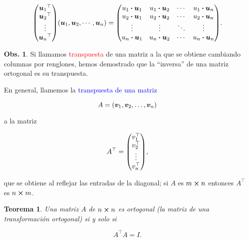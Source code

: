 \documentclass{article}
\theoremstyle{definicion}
\theoremstyle{definition}             %
\theoremstyle{definition}             %
\theoremstyle{definition}
\theoremstyle{definition}
\theoremstyle{observacion}
\newtheorem{obs}{Obs.}
\theoremstyle{definition}
\theoremstyle{plain}
\newtheorem{theorem}{Teorema}
\theoremstyle{definition}
\theoremstyle{afirmacion}
\theoremstyle{notation}
\theoremstyle{definition}
\begin{document}
    \begin{equation*}
        \mqty({\vb*{u}_{1}}^{\top}\\ {\vb*{u}_{2}}^{\top}\\ \vdots\\ {\vb*{u}_{n}}^{\top})(\vb*{u}_{1}, \vb*{u}_{2}, \cdots, \vb*{u}_{n}) = \mqty(u_{1} \vdot \vb*{u}_{1} & u_{1} \vdot \vb*{u}_{2} & \cdots & u_{1} \vdot \vb*{u}_{n}\\
        u_{2} \vdot \vb*{u}_{1} & u_{2} \vdot \vb*{u}_{2} & \cdots & u_{2} \vdot \vb*{u}_{n}\\
        \vdots & \vdots & \ddots & \vdots\\
        u_{n} \vdot \vb*{u}_{1} & u_{n} \vdot \vb*{u}_{2} & \cdots & u_{n} \vdot \vb*{u}_{n}). 
    \end{equation*}

    \begin{obs}
        Si llamamos \textcolor{red}{transpuesta} de una matriz a la que se obtiene cambiando columnas por renglones, hemos demostrado que la ``inversa'' de una matriz ortogonal es su transpuesta.
    \end{obs}

    En general, llamemos la \textcolor{blue}{transpuesta de una matriz}

    \begin{equation*}
        A = (\vb*{v}_{1}, \vb*{v}_{2}, \dots, \vb*{v}_{n})
    \end{equation*}

    a la matriz

    \begin{equation*}
        A^{\top} = \mqty(v_{1}^{\top}\\ v_{2}^{\top}\\ \vdots\\ v_{n}^{\top}),
    \end{equation*}

    que se obtiene al reflejar las entradas de la diagonal; si \(A\) es \(m \cross n\) entonces \(A^{\top}\) es \(n \cross m\).

    \begin{theorem}
        Una matriz \(A\) de \(n \cross n\) es ortogonal (la matriz de una transformación ortogonal) si y solo si

        \begin{equation*}
            A^{\top}A = I.
        \end{equation*}
    \end{theorem}
\end{document}
